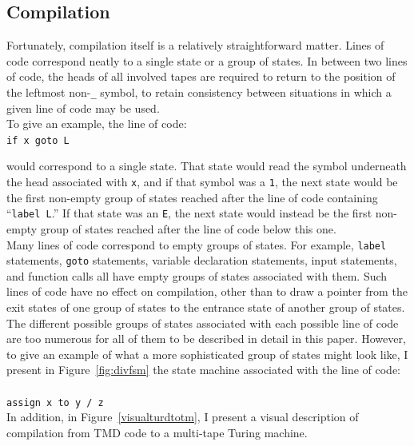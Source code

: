 \documentclass{report}
\begin{document}
\subsection{Compilation \label{compilation}}

Fortunately, compilation itself is a relatively straightforward matter. Lines of code correspond neatly to a single state or a group of states. In between two lines of code, the heads of all involved tapes are required to return to the position of the leftmost non-\texttt{\_} symbol, to retain consistency between situations in which a given line of code may be used. \\

To give an example, the line of code: \\

\texttt{if x goto L}

would correspond to a single state. That state would read the symbol underneath the head associated with \texttt{x}, and if that symbol was a \texttt{1}, the next state would be the first non-empty group of states reached after the line of code containing ``\texttt{label L}.'' If that state was an \texttt{E}, the next state would instead be the first non-empty group of states reached after the line of code below this one.\\

Many lines of code correspond to empty groups of states. For example, \texttt{label} statements, \texttt{goto} statements, variable declaration statements, input statements, and function calls all have empty groups of states associated with them. Such lines of code have no effect on compilation, other than to draw a pointer from the exit states of one group of states to the entrance state of another group of states. \\

The different possible groups of states associated with each possible line of code are too numerous for all of them to be described in detail in this paper. However, to give an example of what a more sophisticated group of states might look like, I present in Figure~\ref{fig:divfsm} the state machine associated with the line of code: \\ \\
\texttt{assign x to y / z} \\

In addition, in Figure~\ref{visualturdtotm}, I present a visual description of compilation from TMD code to a multi-tape Turing machine. \\
\end{document}
